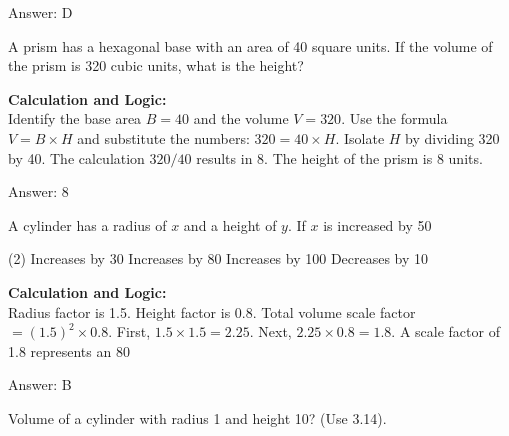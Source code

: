\documentclass[11pt,paper=a4,answers]{exam}
\begin{document}
\begin{questions}
\begin{solution}
\vspace{30pt}

Answer: \colorbox{yellow!100}{D}
\end{solution}

\vspace{60pt}

\question
A prism has a hexagonal base with an area of 40 square units. If the volume of the prism is 320 cubic units, what is the height?

\begin{solution}
\textbf{Calculation and Logic:} \\
Identify the base area $B = 40$ and the volume $V = 320$. Use the formula $V = B \times H$ and substitute the numbers: $320 = 40 \times H$. Isolate $H$ by dividing 320 by 40. The calculation $320 / 40$ results in 8. The height of the prism is 8 units.

\vspace{30pt}

Answer: \colorbox{yellow!100}{8}
\end{solution}

\vspace{60pt}

\question
A cylinder has a radius of $x$ and a height of $y$. If $x$ is increased by 50%
\begin{tasks}(2)
    \task Increases by 30%
    \task Increases by 80%
    \task Increases by 100%
    \task Decreases by 10%
\end{tasks}

\begin{solution}
\textbf{Calculation and Logic:} \\
Radius factor is 1.5. Height factor is 0.8. Total volume scale factor $= (1.5)^2 \times 0.8$. First, $1.5 \times 1.5 = 2.25$. Next, $2.25 \times 0.8 = 1.8$. A scale factor of 1.8 represents an 80%

\vspace{30pt}

Answer: \colorbox{yellow!100}{B}
\end{solution}

\vspace{60pt}

\question
Volume of a cylinder with radius 1 and height 10? (Use 3.14).


\end{questions}
\end{document}
